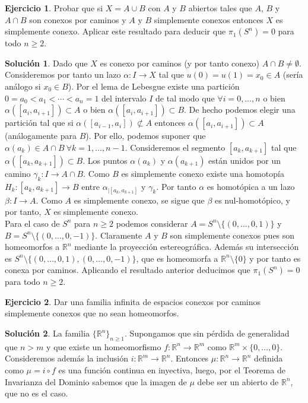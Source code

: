 \documentclass{article}
\theoremstyle{plain}
\theoremstyle{definition}
\newtheorem{exercise}{Ejercicio}
\newtheorem*{sol*}{Solución}
\newcommand{\R}{\mathbb{R}}
\begin{document}
\begin{exercise}
Probar que si $X = A\cup B$ con $A$ y $B$ abiertos tales que $A$, $B$ y $A\cap B$ son conexos por caminos
 y $A$ y $B$ simplemente conexos entonces  $X$ es simplemente conexo. Aplicar este resultado para deducir
 que $\pi_1(S^n) = 0$ para todo $n \geq 2$.
\end{exercise}
\begin{sol*}
Dado que $X$ es conexo por caminos (y por tanto conexo) $A\cap B\neq\emptyset$. Consideremos por tanto un lazo $\alpha: I\to X$ tal que $u(0)=u(1)=x_0\in A$ (sería análogo si $x_0\in B$). Por el lema de Lebesgue existe una partición $0=a_0<a_1<\cdots <a_n=1$ del intervalo $I$ de tal modo que $\forall i=0,\dots, n$ o bien $\alpha([a_i,a_{i+1}])\subset A$ o bien $\alpha([a_i,a_{i+1}])\subset B$. De hecho podemos elegir una partición tal que si $\alpha([a_{i-1},a_{i}])\not\subset A$ entonces $\alpha([a_{i},a_{i+1}])\subset A$ (análogamente para $B$). Por ello, podemos suponer que $\alpha(a_k)\in A\cap B\ \forall k=1,\dots,n-1$. Consideremos el segmento $[a_k,a_{k+1}]$ tal que $\alpha([a_k,a_{k+1}])\subset B$. Los puntos $\alpha(a_k)$ y $\alpha(a_{k+1})$ están unidos por un camino $\gamma_k: I\to A\cap B$. Como $B$ es simplemente conexo existe una homotopía $H_k:[a_k,a_{k+1}]\to B$ entre $\alpha_{\big|[a_k,a_{k+1}]}$ y $\gamma_k$. Por tanto $\alpha$ es homotópica a un lazo $\beta:I\to A$. Como $A$ es simplemente conexo, se sigue que $\beta$ es nul-homotópico, y por tanto, $X$ es simplemente conexo.\\
Para el caso de $S^n$ para $n\geq 2$ podemos considerar $A=S^n\setminus\{(0,\dots,0,1)\}$ y $B=S^n\setminus\{(0,\dots,0,-1)\}$. Claramente $A$ y $B$ son simplemente conexos pues son homeomorfos a $\R^n$ mediante la proyección estereográfica. Además su intersección es $S^n\setminus\{(0,\dots,0,1),(0,\dots,0,-1)\}$, que es homeomorfa a $\R^n\setminus\{0\}$ y por tanto es conexa por caminos. Aplicando el resultado anterior deducimos que $\pi_1(S^n) = 0$ para todo $n \geq 2$.  
\end{sol*}

\newpage 

\begin{exercise}
Dar una familia infinita de espacios conexos por caminos simplemente conexos que no sean homeomorfos.
\end{exercise}
\begin{sol*}
La familia $\{\R^n\}_{n\geq 1}$. Supongamos que sin pérdida de generalidad que $n>m$ y que existe un homeomorfismo $f:\R^n \to \R^m$ como $\R^m\times\{0,\dotsc,0\}$. Consideremos además la inclusión $i:\R^m \to \R^n$. Entonces $\mu :\R^n \to \R^n$ definida como $\mu = i\circ f$ es una función continua en inyectiva, luego, por el Teorema de Invarianza del Dominio sabemos que la imagen de $\mu$ debe ser un abierto de $\R^n$, que no es el caso.
\end{sol*}
\end{document}
